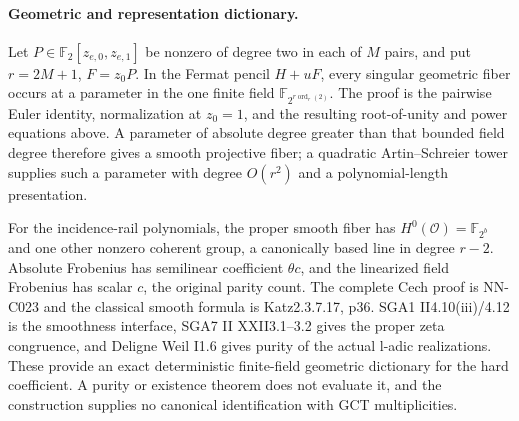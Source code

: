 \paragraph{Geometric and representation dictionary.}
Let $P\in\mathbb F_2[z_{e,0},z_{e,1}]$ be nonzero of degree two in each of $M$ pairs, and put $r=2M+1$, $F=z_0P$. In the Fermat pencil $H+uF$, every singular geometric fiber occurs at a parameter in the one finite field $\mathbb F_{2^{r\operatorname{ord}_r(2)}}$. The proof is the pairwise Euler identity, normalization at $z_0=1$, and the resulting root-of-unity and power equations above. A parameter of absolute degree greater than that bounded field degree therefore gives a smooth projective fiber; a quadratic Artin--Schreier tower supplies such a parameter with degree $O(r^2)$ and a polynomial-length presentation.

For the incidence-rail polynomials, the proper smooth fiber has $H^0(\mathcal O)=\mathbb F_{2^b}$ and one other nonzero coherent group, a canonically based line in degree $r-2$. Absolute Frobenius has semilinear coefficient $\theta c$, and the linearized field Frobenius has scalar $c$, the original parity count. The complete Cech proof is NN-C023 and the classical smooth formula is Katz2.3.7.17, p36. SGA1 II4.10(iii)/4.12 is the smoothness interface, SGA7 II XXII3.1--3.2 gives the proper zeta congruence, and Deligne Weil I1.6 gives purity of the actual l-adic realizations. These provide an exact deterministic finite-field geometric dictionary for the hard coefficient. A purity or existence theorem does not evaluate it, and the construction supplies no canonical identification with GCT multiplicities.



